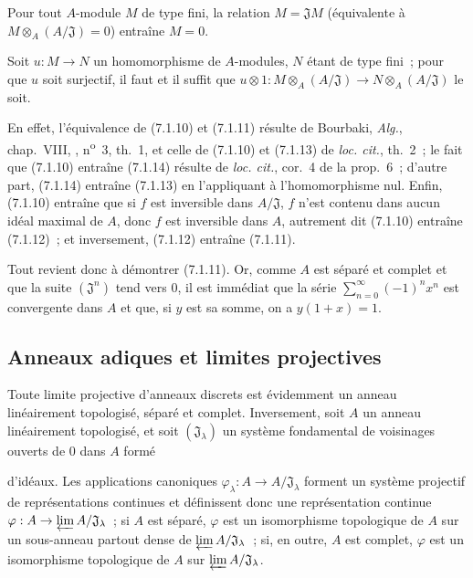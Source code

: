 \begin{corollary}[7.1.13]
\label{0.7.1.13-fr}
Pour tout $A$-module $M$ de type fini, la relation $M=\mathfrak JM$
(équivalente à $M\otimes_A(A/\mathfrak J)=0$) entraîne $M=0$.
\end{corollary}

\begin{corollary}[7.1.14]
\label{0.7.1.14-fr}
Soit $u:M\to N$ un homomorphisme de $A$-modules, $N$ étant de type fini~;
pour que $u$ soit surjectif, il faut et il suffit que
$u\otimes1:M\otimes_A(A/\mathfrak J)\to N\otimes_A(A/\mathfrak J)$ le soit.
\end{corollary}

En effet, l'équivalence de (7.1.10) et (7.1.11) résulte de Bourbaki,
\emph{Alg.}, chap.~VIII, , n\textsuperscript{o}~3, th.~1, et
celle de (7.1.10) et (7.1.13) de \emph{loc. cit.}, th.~2~; le fait que
(7.1.10) entraîne (7.1.14) résulte de \emph{loc. cit.}, cor.~4 de la prop.~6~;
d'autre part, (7.1.14) entraîne (7.1.13) en l'appliquant à l'homomorphisme nul.
Enfin, (7.1.10) entraîne que si $f$ est inversible dans $A/\mathfrak J$, $f$
n'est contenu dans aucun idéal maximal de $A$, donc $f$ est inversible dans
$A$, autrement dit (7.1.10) entraîne (7.1.12)~; et inversement, (7.1.12)
entraîne (7.1.11).

Tout revient donc à démontrer (7.1.11). Or, comme $A$ est séparé et complet et
que la suite $(\mathfrak J^n)$ tend vers $0$, il est immédiat que la série
$\sum_{n=0}^{\infty}(-1)^n x^n$ est convergente dans $A$ et que, si $y$ est
sa somme, on a $y(1+x)=1$.

\subsection{Anneaux adiques et limites projectives}
\label{subsection:0.7.2-fr}

\begin{env}[7.2.1]
\label{0.7.2.1-fr}
Toute limite projective d'anneaux discrets est évidemment un anneau
linéairement topologisé, séparé et complet. Inversement, soit $A$ un anneau
linéairement topologisé, et soit $(\mathfrak J_\lambda)$ un système fondamental
de voisinages ouverts de $0$ dans $A$ formé


d'idéaux. Les applications canoniques
$\varphi_\lambda:A\to A/\mathfrak J_\lambda$ forment un système projectif de
représentations continues et définissent donc une représentation continue
$\varphi:A\to\varprojlim A/\mathfrak J_\lambda$~; si $A$ est séparé,
$\varphi$ est un isomorphisme topologique de $A$ sur un
sous-anneau partout dense de $\varprojlim A/\mathfrak J_\lambda$~; si, en
outre, $A$ est complet, $\varphi$ est un isomorphisme topologique de $A$ sur
$\varprojlim A/\mathfrak J_\lambda$.
\end{env}

